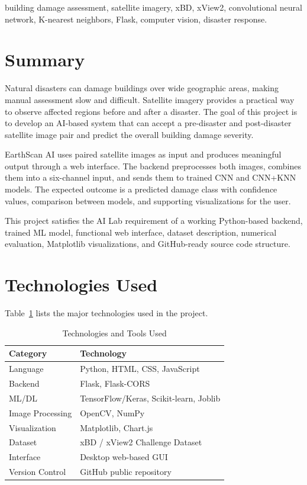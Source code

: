 \documentclass[conference]{IEEEtran}
\begin{document}
\begin{IEEEkeywords}
building damage assessment, satellite imagery, xBD, xView2, convolutional neural network, K-nearest neighbors, Flask, computer vision, disaster response.
\end{IEEEkeywords}

\section{Summary}
Natural disasters can damage buildings over wide geographic areas, making manual assessment slow and difficult. Satellite imagery provides a practical way to observe affected regions before and after a disaster. The goal of this project is to develop an AI-based system that can accept a pre-disaster and post-disaster satellite image pair and predict the overall building damage severity.

EarthScan AI uses paired satellite images as input and produces meaningful output through a web interface. The backend preprocesses both images, combines them into a six-channel input, and sends them to trained CNN and CNN+KNN models. The expected outcome is a predicted damage class with confidence values, comparison between models, and supporting visualizations for the user.

This project satisfies the AI Lab requirement of a working Python-based backend, trained ML model, functional web interface, dataset description, numerical evaluation, Matplotlib visualizations, and GitHub-ready source code structure.

\section{Technologies Used}
Table~\ref{tab:tech} lists the major technologies used in the project.

\begin{table}[h]
\centering
\caption{Technologies and Tools Used}
\label{tab:tech}
\begin{tabular}{p{2.2cm}p{5.2cm}}
\toprule
\textbf{Category} & \textbf{Technology} \\
\midrule
Language & Python, HTML, CSS, JavaScript \\
Backend & Flask, Flask-CORS \\
ML/DL & TensorFlow/Keras, Scikit-learn, Joblib \\
Image Processing & OpenCV, NumPy \\
Visualization & Matplotlib, Chart.js \\
Dataset & xBD / xView2 Challenge Dataset \\
Interface & Desktop web-based GUI \\
Version Control & GitHub public repository \\
\bottomrule
\end{tabular}
\end{table}
\end{document}
